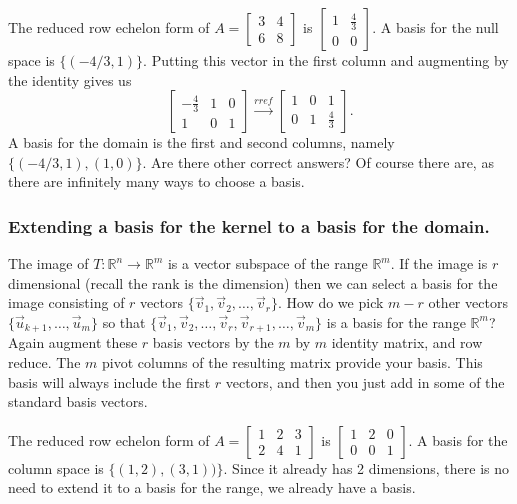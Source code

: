 \begin{example}
The reduced row echelon form of 
$A=
\begin{bmatrix}
 3 & 4 \\
 6 & 8
\end{bmatrix}
$
is
$
\begin{bmatrix}
 1 & \frac{4}{3} \\
 0 & 0
\end{bmatrix}
$.  A basis for the null space is $\{(-4/3,1)\}$. Putting this vector in the first column and augmenting by the identity gives us 
$$
\begin{bmatrix}
 -\frac{4}{3} & 1 & 0 \\
 1 & 0 & 1
\end{bmatrix}
\xrightarrow{rref}
\begin{bmatrix}
 1 & 0 & 1 \\
 0 & 1 & \frac{4}{3}
\end{bmatrix}
.$$
A basis for the domain is the first and second columns, namely $\{(-4/3,1),(1,0)\}$. Are there other correct answers? Of course there are, as there are infinitely many ways to choose a basis.

\end{example}

\subsubsection{Extending a basis for the kernel to a basis for the domain.}
The image of $T\colon{\mathbb{R}}^n\to{\mathbb{R}}^m$ is a vector subspace of the range ${\mathbb{R}}^m$. If the image is $r$ dimensional (recall the rank is the dimension) then we can select a basis for the image consisting of $r$ vectors $\{\vec v_1, \vec v_2,\ldots, \vec v_r\}$. How do we pick $m-r$ other vectors $\{\vec u_{k+1},\ldots, \vec u_m\}$ so that $\{\vec v_1, \vec v_2,\ldots, \vec v_r,\vec v_{r+1},\ldots, \vec v_m\}$ is a basis for the range ${\mathbb{R}}^m$? Again augment these $r$ basis vectors by the $m$ by $m$ identity matrix, and row reduce.  The $m$ pivot columns of the resulting matrix provide your basis.  This basis will always include the first $r$ vectors, and then you just add in some of the standard basis vectors.

\begin{example}
The reduced row echelon form of 
$A=
\begin{bmatrix}
 1 & 2 & 3 \\
 2 & 4 & 1
\end{bmatrix}
$
is
$
\begin{bmatrix}
 1 & 2 & 0 \\
 0 & 0 & 1
\end{bmatrix}
$.  A basis for the column space is $\{(1,2),(3,1))\}$. Since it already has 2 dimensions, there is no need to extend it to a basis for the range, we already have a basis.
\end{example}

